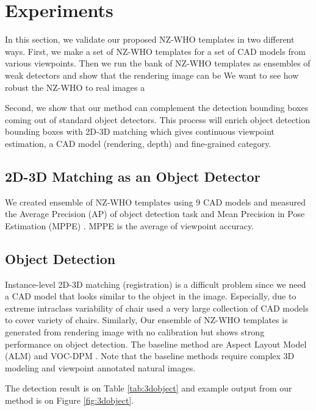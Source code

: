 \documentclass[10pt,twocolumn,letterpaper]{article}
\begin{document}
\section{Experiments}

In this section, we validate our proposed NZ-WHO templates in two different ways. First, we make a set of NZ-WHO templates for a set of CAD models from various viewpoints. Then we run the bank of NZ-WHO templates as ensembles of weak detectors and show that the rendering image can be We want to see how robust the NZ-WHO to real images a

Second, we show that our method can complement the detection bounding boxes coming out of standard object detectors. This process will enrich object detection bounding boxes with 2D-3D matching which gives continuous viewpoint estimation, a CAD model (rendering, depth) and fine-grained category.  

\subsection{2D-3D Matching as an Object Detector} 

We created ensemble of NZ-WHO templates using 9 CAD models and measured the Average Precision (AP) of object detection task and Mean Precision in Pose Estimation (MPPE) \cite{Lopez-Sastre11}. MPPE is the average of viewpoint accuracy.  
\subsection{Object Detection} 
Instance-level 2D-3D matching (registration) is a difficult problem since we need a CAD model that looks similar to the object in the image. Especially, due to extreme intraclass variability of chair \cite{Aubry14} used a very large collection of CAD models to cover variety of chairs. Similarly, \cite{Lim14}
Our ensemble of NZ-WHO templates is generated from rendering image with no calibration but shows strong performance on object detection. The baseline method are Aspect Layout Model (ALM) \cite{Xiang12} and VOC-DPM \cite{Pepik12}. Note that the baseline methods require complex 3D modeling and viewpoint annotated natural images.

The detection result is on Table \ref{tab:3dobject} and example output from our method is on Figure \ref{fig:3dobject}. 
\end{document}
